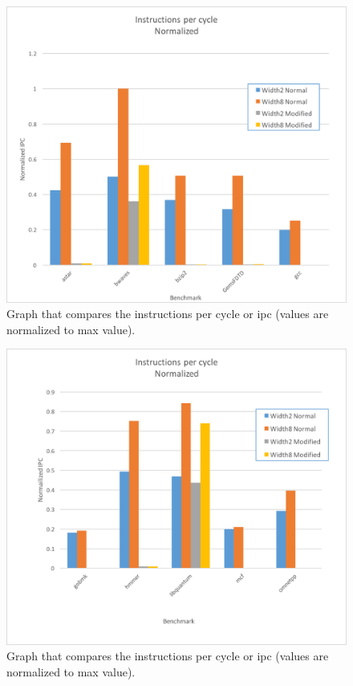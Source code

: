 \documentclass[letterpaper, 10 pt, conference]{ieeeconf}  %
\begin{document}
\begin{figure}[thpb]
	\centering
	\includegraphics[scale=.45]{IPC1}
   \caption{Graph that compares the instructions per cycle or ipc (values are normalized to max value).}
\end{figure}

\begin{figure}[thpb]
	\centering
	\includegraphics[scale=.45]{IPC2}
   \caption{Graph that compares the instructions per cycle or ipc (values are normalized to max value).}
\end{figure}
\end{document}
